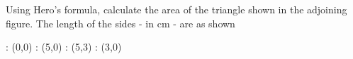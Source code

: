 
%
%
%
%
% 

\question[4] Using Hero's formula, calculate the area of the triangle 
shown in the adjoining figure. The length of the sides - in cm - are 
as shown

\ifprintanswers
  \begin{marginfigure}
    : (0,0)
    : (5,0)
    : (5,3)
    : (3,0)
  	\figdrawbegin{}
    \figdrawline [1,2,3,1]
    \figdrawline [3,4]
    \figdrawend
    \centerline{\box\figBoxA}
  \end{marginfigure}
\fi 

\begin{solution}
\end{solution}
